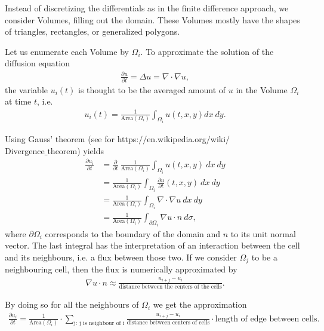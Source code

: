 \documentclass[12pt,a4paper]{article}
\begin{document}
Instead of discretizing the differentials as in the finite difference approach, we consider Volumes, filling out the domain. These Volumes mostly have the shapes of triangles, rectangles, or generalized polygons.

Let us enumerate each Volume by $\Omega_{i}$. To approximate the solution of the diffusion equation
\begin{align*}
\frac{\partial u}{\partial t} = \Delta u = \nabla \cdot \nabla u,
\end{align*}
the variable $u_{i}(t)$ is thought to be the averaged amount of $u$ in the Volume $\Omega_{i}$ at time $t$, i.e. 
\begin{align*}
u_{i}(t) = \frac{1}{\text{Area}(\Omega_{i})} \int_{\Omega_{i}} u(t,x,y) dx\ dy.
\end{align*}

Using Gauss' theorem (see for https:$//$en.wikipedia.org$/$wiki$/$\\Divergence$\_$theorem) yields
\begin{align*}
\frac{\partial u_{i}}{\partial t} &= \frac{\partial}{\partial t} \ \frac{1}{\text{Area}(\Omega_{i})} \int_{\Omega_{i}} u(t,x,y)\ dx\ dy \\
&= \frac{1}{\text{Area}(\Omega_{i})} \int_{\Omega_{i}} \frac{\partial u}{\partial t} (t,x,y) \ dx\ dy \\
&= \frac{1}{\text{Area}(\Omega_{i})} \int_{\Omega_{i}} \nabla \cdot \nabla u\  dx\ dy \\
&= \frac{1}{\text{Area}(\Omega_{i})} \int_{\partial \Omega_{i}} \nabla u \cdot n\  d\sigma,
\end{align*}
where $\partial \Omega_{i}$ corresponds to the boundary of the domain and $n$ to its unit normal vector. The last integral has the interpretation of an interaction between the cell and its neighbours, i.e. a flux between those two. If we consider $\Omega_{j}$ to be a neighbouring cell, then the flux is numerically approximated by
\begin{align*}
\nabla u \cdot n \approx \frac{u_{i+j}-u_{i}}{\text{distance between the centers of the cells}}. 
\end{align*}

By doing so for all the neighbours of $\Omega_{i}$ we get the approximation
\begin{align*}
\frac{\partial u_{i}}{\partial t} = \frac{1}{\text{Area}(\Omega_{i})} \cdot \sum_{\text{j: j is neighbour of i}} \frac{u_{i+j}-u_{i}}{\text{distance between centers of cells}} \cdot \text{length of edge between cells}.
\end{align*}
\end{document}
